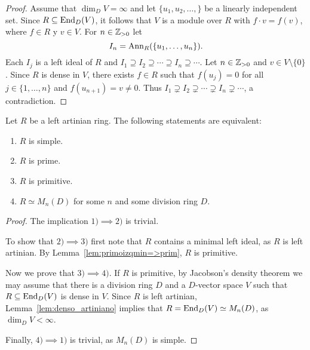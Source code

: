 \begin{proof}
	Assume that $\dim_DV=\infty$ and let $\{u_1,u_2,\dots,\}$ be a linearly independent set. 
	Since $R\subseteq\operatorname{End}_D(V)$, it follows that 
	$V$ is a module over $R$ with $f\cdot v=f(v)$, where $f\in R$ y $v\in V$. 
	For $n\in\mathbb{Z}_{>0}$ let 
	\[
		I_n=\operatorname{Ann}_R(\{u_1,\dots,u_n\}).
	\]
	Each $I_j$ is a left ideal of $R$ and $I_1\supseteq
	I_2\supseteq\cdots\supseteq I_n\supseteq\cdots$. Let 
	$n\in\mathbb{Z}_{>0}$ and $v\in V\setminus\{0\}$. Since $R$ is dense
	in $V$, there exists $f\in R$ such that $f(u_j)=0$ for all $j\in\{1,\dots,n\}$ and 
	$f(u_{n+1})=v\ne0$. Thus $I_1\supsetneq I_2\supsetneq\cdots\supsetneq
	I_n\supsetneq\cdots$, a contradiction.
\end{proof}

\begin{theorem}[Wedderburn]
	Let $R$ be a left artinian ring. The following statements are equivalent:
	\begin{enumerate}
		\item $R$ is simple.
		\item $R$ is prime.
		\item $R$ is primitive.
		\item $R\simeq M_n(D)$ for some $n$ and some division ring $D$.
	\end{enumerate}
\end{theorem}

\begin{proof}
	The implication $1)\implies2)$ is trivial. 
	
	To show that $2)\implies3)$ first note that 
	$R$ contains a minimal left ideal, as $R$ is left artinian. 
	By Lemma~\ref{lem:primoizqmin=>prim}, $R$ is primitive. 

	Now we prove that $3)\implies4)$. If $R$ is primitive, by 
	Jacobson's density theorem we may assume that there is a division ring $D$ and a $D$-vector space $V$ such that 
    $R\subseteq\operatorname{End}_D(V)$ is dense in $V$. 
	Since $R$ is left artinian, Lemma~\ref{lem:denso_artiniano} implies that  
	$R=\operatorname{End}_D(V)\simeq M_n(D)$, as $\dim_DV<\infty$. 

	Finally, $4)\implies1)$ is trivial, as $M_n(D)$ is simple. 
\end{proof}
